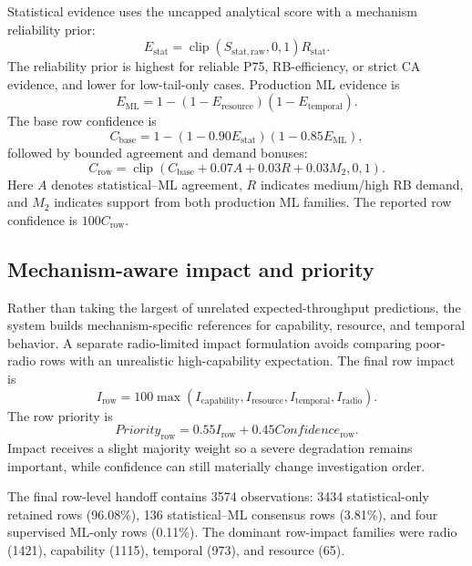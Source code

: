 Statistical evidence uses the uncapped analytical score with a mechanism reliability prior:
\begin{equation}
E_{\mathrm{stat}}=\operatorname{clip}(S_{\mathrm{stat,raw}},0,1)R_{\mathrm{stat}}.
\end{equation}
The reliability prior is highest for reliable P75, RB-efficiency, or strict CA evidence, and lower for low-tail-only cases. Production ML evidence is
\begin{equation}
E_{\mathrm{ML}}=1-(1-E_{\mathrm{resource}})(1-E_{\mathrm{temporal}}).
\end{equation}
The base row confidence is
\begin{equation}
C_{\mathrm{base}}=1-(1-0.90E_{\mathrm{stat}})(1-0.85E_{\mathrm{ML}}),
\end{equation}
followed by bounded agreement and demand bonuses:
\begin{equation}
C_{\mathrm{row}}=\operatorname{clip}\left(C_{\mathrm{base}}+0.07A+0.03R+0.03M_2,0,1\right).
\end{equation}
Here $A$ denotes statistical--ML agreement, $R$ indicates medium/high RB demand, and $M_2$ indicates support from both production ML families. The reported row confidence is $100C_{\mathrm{row}}$.

\subsection{Mechanism-aware impact and priority}

Rather than taking the largest of unrelated expected-throughput predictions, the system builds mechanism-specific references for capability, resource, and temporal behavior. A separate radio-limited impact formulation avoids comparing poor-radio rows with an unrealistic high-capability expectation. The final row impact is
\begin{equation}
I_{\mathrm{row}}=100\max\left(I_{\mathrm{capability}},I_{\mathrm{resource}},I_{\mathrm{temporal}},I_{\mathrm{radio}}\right).
\end{equation}
The row priority is
\begin{equation}
\boxed{Priority_{\mathrm{row}}=0.55I_{\mathrm{row}}+0.45Confidence_{\mathrm{row}}.}
\end{equation}
Impact receives a slight majority weight so a severe degradation remains important, while confidence can still materially change investigation order.

The final row-level handoff contains \num{3574} observations: \num{3434} statistical-only retained rows (96.08\%), 136 statistical--ML consensus rows (3.81\%), and four supervised ML-only rows (0.11\%). The dominant row-impact families were radio (\num{1421}), capability (\num{1115}), temporal (973), and resource (65).

